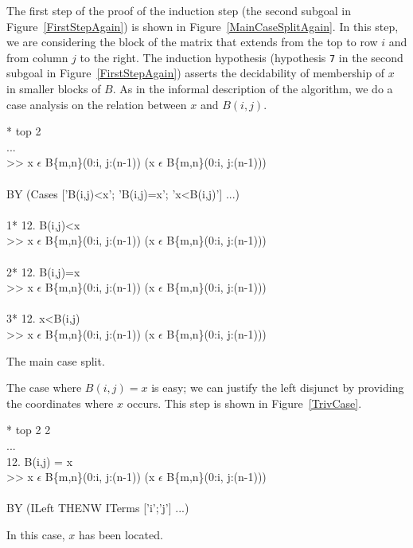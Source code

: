 The first step of the proof of the induction step (the second subgoal
in Figure~\ref{FirstStepAgain}) is shown in
Figure~\ref{MainCaseSplitAgain}.  
In this step, we are considering the block of the
matrix that extends from the top to row $i$ and from column $j$ to the right.  
The induction hypothesis (hypothesis {\tt 7} in the second subgoal in
Figure~\ref{FirstStepAgain})
asserts the decidability of membership of $x$ in smaller blocks of $B$.
As in the informal description of the algorithm, we do a case analysis
on the relation between $x$ and $B(i,j)$.
\begin{RuledFigure}
\begin{Screen}{1}{\SnapshotSize}
\N{}* top 2 \\{}
\N{}... \\{}
\N{}>> x \(\epsilon{}\) B\{m,n\}(0:i, j:(n-1))  \mvee{}  \mneg{}(x \(\epsilon{}\) B\{m,n\}(0:i, j:(n-1))) \\{}
\N{} \\{}
\N{}BY (Cases ['B(i,j)<x'; 'B(i,j)=x'; 'x<B(i,j)'] ...) \\{}
\N{}    \\{}
\N{}1* 12. B(i,j)<x \\{}
\N{}   >> x \(\epsilon{}\) B\{m,n\}(0:i, j:(n-1))  \mvee{}  \mneg{}(x \(\epsilon{}\) B\{m,n\}(0:i, j:(n-1))) \\{}
\N{} \\{}
\N{}2* 12. B(i,j)=x \\{}
\N{}   >> x \(\epsilon{}\) B\{m,n\}(0:i, j:(n-1))  \mvee{}  \mneg{}(x \(\epsilon{}\) B\{m,n\}(0:i, j:(n-1))) \\{}
\N{} \\{}
\N{}3* 12. x<B(i,j) \\{}
\N{}   >> x \(\epsilon{}\) B\{m,n\}(0:i, j:(n-1))  \mvee{}  \mneg{}(x \(\epsilon{}\) B\{m,n\}(0:i, j:(n-1)))       
\end{Screen}%
\caption{The main case split.}
\label{MainCaseSplitAgain} 
\end{RuledFigure}%
The case where $B(i,j)=x$ is easy; we can justify the left disjunct by
providing the coordinates where $x$ occurs.  This step is shown in
Figure~\ref{TrivCase}.
\begin{RuledFigure}
\begin{Screen}{1}{\SnapshotSize}
\N{}* top 2 2 \\{}
\N{}... \\{}
\N{}12. B(i,j) = x \\{}
\N{}>> x \(\epsilon{}\) B\{m,n\}(0:i, j:(n-1))  \mvee{}  \mneg{}(x \(\epsilon{}\) B\{m,n\}(0:i, j:(n-1))) \\{}
\N{} \\{}
\N{}BY (ILeft THENW ITerms ['i';'j'] ...) 
\end{Screen}%
\caption{In this case, $x$ has been located.}
\label{TrivCase}
\end{RuledFigure}%
